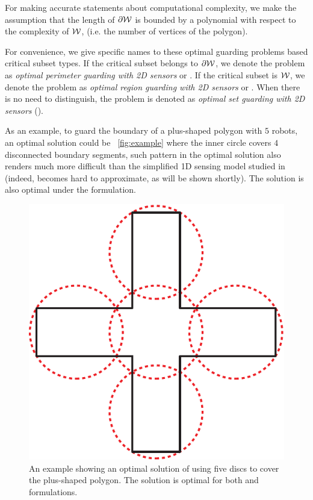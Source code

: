 For making accurate statements about computational complexity, we make
the assumption that the length of $\partial \mathcal W$ is bounded by a polynomial with respect 
to the complexity of $\mathcal W$, (i.e. the number of vertices of the polygon). 

For convenience, we give specific names to these optimal guarding 
problems based critical subset types. If the critical 
subset belongs to $\partial \mathcal W$, we denote the problem as {\em optimal 
perimeter guarding with 2D sensors} or \opgt. If the critical subset 
is $\mathcal W$, we denote the problem as {\em optimal region guarding with 
2D sensors} or \orgt. When there is no need to distinguish, the problem 
is denoted as {\em optimal set guarding with 2D sensors} (\osgt). 

As an example, to guard the boundary of a plus-shaped polygon with $5$ 
robots, an optimal solution could be ~\ref{fig:example} where the 
inner circle covers $4$ disconnected boundary segments, such pattern 
in the optimal solution also renders \opgt much more difficult than 
the simplified 1D sensing model studied in \cite{fenghangaoyu2019efficient} 
(indeed, \opgt becomes hard to approximate, as will be shown shortly). 
The solution is also optimal under the \orgt formulation.
\begin{figure}[ht]
    \centering
		\vspace*{3mm}
    \includegraphics[scale=0.35]{chapters/osg/figures/exp_fig-e-eps-converted-to.pdf}
		\vspace*{1.5mm}
    \caption{An example showing an optimal solution of using five discs
		to cover the plus-shaped polygon. The solution is optimal for both 
		\opgt and \orgt formulations.}
    \label{fig:osg-example}
\end{figure}

